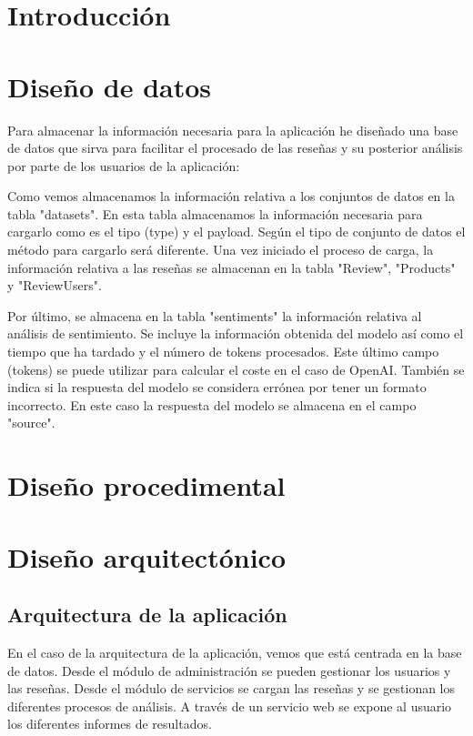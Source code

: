 
\section{Introducción}

\section{Diseño de datos}
Para almacenar la información necesaria para la aplicación he diseñado una base de datos 
que sirva para facilitar el procesado de las reseñas y su posterior análisis 
por parte de los usuarios de la aplicación:


Como vemos almacenamos la información relativa a los conjuntos de datos en la tabla "datasets".
En esta tabla almacenamos la información necesaria para cargarlo como es el tipo (type) y el payload.
Según el tipo de conjunto de datos el método para cargarlo será diferente.
Una vez iniciado el proceso de carga, la información relativa a las reseñas se almacenan en la tabla "Review", "Products" y "ReviewUsers".

Por último, se almacena en la tabla "sentiments" la información relativa al análisis de sentimiento.
Se incluye la información obtenida del modelo así como el tiempo que ha tardado y el número de tokens procesados.
Este último campo (tokens) se puede utilizar para calcular el coste en el caso de OpenAI.
También se indica si la respuesta del modelo se considera errónea por tener un formato incorrecto. 
En este caso la respuesta del modelo se almacena en el campo "source".

\section{Diseño procedimental}

\section{Diseño arquitectónico}

\subsection{Arquitectura de la aplicación}

En el caso de la arquitectura de la aplicación, vemos que está centrada en la base de datos.
Desde el módulo de administración se pueden gestionar los usuarios y las reseñas.
Desde el módulo de servicios se cargan las reseñas y se gestionan los diferentes procesos de análisis.
A través de un servicio web se expone al usuario los diferentes informes de resultados.

